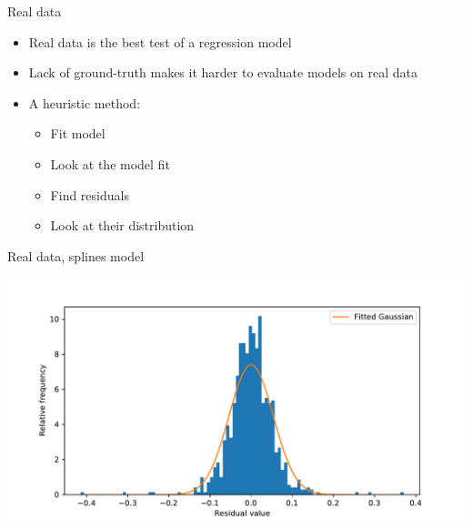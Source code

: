 \documentclass[presentation]{beamer}
\begin{document}
\begin{frame}[label={sec:org216b5b9}]{Real data}
\begin{itemize}
\item Real data is the best test of a regression model
\item Lack of ground-truth makes it harder to evaluate models on real data
\item A heuristic method:
\begin{itemize}
\item Fit model
\item Look at the model fit
\item Find residuals
\item Look at their distribution
\end{itemize}
\end{itemize}
\end{frame}

\begin{frame}[label={sec:orgdbb3871}]{Real data, splines model}
\begin{center}
\includegraphics[width=.9\textwidth]{./hist.pdf}
\end{center}
\vfill
\end{frame}
\end{document}
